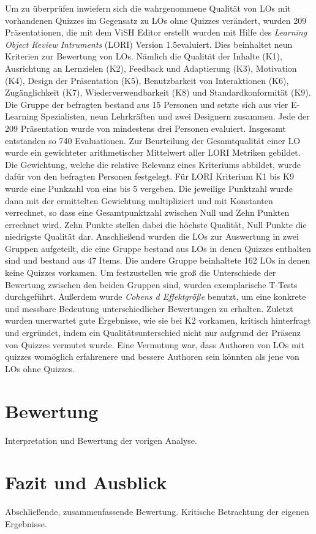 \documentclass[conference]{IEEEtran}
\begin{document}
Um zu überprüfen inwiefern sich die wahrgenommene Qualität von LOs mit vorhandenen Quizzes im Gegensatz zu LOs ohne Quizzes verändert, wurden 209 Präsentationen, die mit dem ViSH Editor erstellt wurden mit Hilfe des \emph{Learning Object Review Intruments} (LORI) Version 1.5\cite{Leacock2007}evaluiert. Dies beinhaltet neun Kriterien zur Bewertung von LOs. Nämlich die Qualität der Inhalte (K1), Ausrichtung an Lernzielen (K2), Feedback und Adaptierung (K3), Motivation (K4), Design der Präsentation (K5), Benutzbarkeit von Interaktionen (K6), Zugänglichkeit (K7), Wiederverwendbarkeit (K8) und Standardkonformität (K9). Die Gruppe der befragten bestand aus 15 Personen und setzte sich aus vier E-Learning Spezialisten, neun Lehrkräften und zwei Designern zusammen. Jede der 209 Präsentation wurde von mindestens drei Personen evaluiert. Insgesamt entstanden so 740 Evaluationen. Zur Beurteilung der Gesamtqualität einer LO wurde ein gewichteter arithmetischer Mittelwert aller LORI Metriken gebildet. Die Gewichtung, welche die relative Relevanz eines Kriteriums abbildet, wurde dafür von den befragten Personen festgelegt. Für LORI Kriterium K1 bis K9 wurde eine Punkzahl von eins bis 5 vergeben. Die jeweilige Punktzahl wurde dann mit der ermittelten Gewichtung multipliziert und mit Konstanten verrechnet, so dass eine Gesamtpunktzahl zwischen Null und Zehn Punkten errechnet wird. Zehn Punkte stellen dabei die höchste Qualität, Null Punkte die
niedrigste Qualität dar. Anschließend wurden die LOs zur Auswertung in zwei Gruppen aufgeteilt, die eine Gruppe bestand aus LOs in denen Quizzes enthalten sind und bestand aus 47 Items. Die andere Gruppe beinhaltete 162 LOs in denen keine Quizzes vorkamen. Um festzustellen wie groß die Unterschiede der Bewertung zwischen den beiden Gruppen sind, wurden exemplarische T-Tests durchgeführt. Außerdem wurde \emph{Cohens d Effektgröße} benutzt, um eine konkrete und messbare Bedeutung unterschiedlicher Bewertungen zu erhalten. Zuletzt wurden unerwartet gute Ergebnisse, wie sie bei K2 vorkamen, kritisch hinterfragt und ergründet, indem ein Qualitätsunterschied nicht nur aufgrund der Präsenz von Quizzes vermutet wurde. Eine Vermutung war, dass Authoren von LOs mit quizzes womöglich erfahrenere und bessere Authoren sein könnten als jene von LOs ohne Quizzes.
\section{Bewertung}
Interpretation und Bewertung der vorigen Analyse.


\section{Fazit und Ausblick}
Abschließende, zusammenfassende Bewertung. Kritische Betrachtung der eigenen Ergebnisse.
\end{document}
